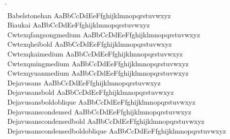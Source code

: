 \begin{tabbing}
\phantom{XXXXXXXXXXXXXXXXXXXXXXXXX} \= \phantom{XXXXXXXXXXXXXXXXXXXXXXXXXXXXXXXXXXXXXXXXXXXXXXXXXXXXXXXXXXXX} \\
Babelstonehan \> { AaBbCcDdEeFfghijklmnopqrstuvwxyz} \\
Biaukai \> { AaBbCcDdEeFfghijklmnopqrstuvwxyz} \\
Cwtexqfangsongmedium \> { AaBbCcDdEeFfghijklmnopqrstuvwxyz} \\
Cwtexqheibold \> { AaBbCcDdEeFfghijklmnopqrstuvwxyz} \\
Cwtexqkaimedium \> { AaBbCcDdEeFfghijklmnopqrstuvwxyz} \\
Cwtexqmingmedium \> { AaBbCcDdEeFfghijklmnopqrstuvwxyz} \\
Cwtexqyuanmedium \> { AaBbCcDdEeFfghijklmnopqrstuvwxyz} \\
Dejavusans \> { AaBbCcDdEeFfghijklmnopqrstuvwxyz} \\
Dejavusansbold \> { AaBbCcDdEeFfghijklmnopqrstuvwxyz} \\
Dejavusansboldoblique \> { AaBbCcDdEeFfghijklmnopqrstuvwxyz} \\
Dejavusanscondensed \> { AaBbCcDdEeFfghijklmnopqrstuvwxyz} \\
Dejavusanscondensedbold \> { AaBbCcDdEeFfghijklmnopqrstuvwxyz} \\
Dejavusanscondensedboldoblique \> { AaBbCcDdEeFfghijklmnopqrstuvwxyz} \\

\end{tabbing}
